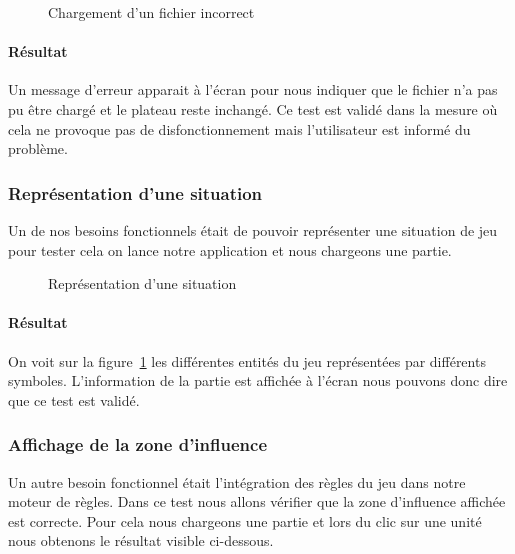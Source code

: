 				\begin{figure}[!h]
				    \caption{Chargement d'un fichier incorrect}
				    \centering
				\end{figure}

				\paragraph{Résultat\\}
					Un message d'erreur apparait à l'écran pour nous indiquer que le fichier n'a pas pu être chargé et le plateau reste inchangé.
					Ce test est validé dans la mesure où cela ne provoque pas de disfonctionnement mais l'utilisateur est informé du problème.

			\subsubsection{Représentation d'une situation}
				Un de nos besoins fonctionnels était de pouvoir représenter une situation de jeu pour tester cela on lance notre application et nous chargeons une partie.

				\begin{figure}[!h]
				    \caption{Représentation d'une situation}
				    \centering
				    \label{fig:representation_situation}
				\end{figure}

				\paragraph{Résultat\\}
					On voit sur la figure~\ref{fig:representation_situation} les différentes entités du jeu représentées par différents symboles.
					L'information de la partie est affichée à l'écran nous pouvons donc dire que ce test est validé.

			\subsubsection{Affichage de la zone d'influence}
				Un autre besoin fonctionnel était l'intégration des règles du jeu dans notre moteur de règles. Dans ce test nous allons vérifier que la zone d'influence affichée est correcte. Pour cela nous chargeons une partie et lors du clic sur une unité nous obtenons le résultat visible ci-dessous.

